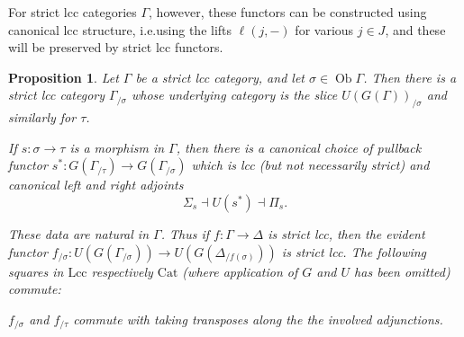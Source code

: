 \documentclass[a4paper]{article}
\newtheorem{proposition}[theorem]{Proposition}
\theoremstyle{remark}
\theoremstyle{definition}
\begin{document}
For strict lcc categories $\Gamma$, however, these functors can be constructed using canonical lcc structure, i.e.\@ using the lifts $\ell(j, -)$ for various $j \in J$, and these will be preserved by strict lcc functors.
\begin{proposition}
  \label{prop:strict-slicing}
  Let $\Gamma$ be a strict lcc category, and let $\sigma \in \operatorname{Ob} \Gamma$.
  Then there is a strict lcc category $\Gamma_{/ \sigma}$ whose underlying category is the slice $U(G(\Gamma))_{/ \sigma}$ and similarly for $\tau$.

  If $s : \sigma \rightarrow \tau$ is a morphism in $\Gamma$, then there is a canonical choice of pullback functor $s^* : G(\Gamma_{/ \tau}) \rightarrow G(\Gamma_{/ \sigma})$ which is lcc (but not necessarily strict) and canonical left and right adjoints
  \begin{equation}
    \Sigma_s \dashv U(s^*) \dashv \Pi_s.
  \end{equation}

  These data are natural in $\Gamma$.
  Thus if $f : \Gamma \rightarrow \Delta$ is strict lcc, then the evident functor $f_{/ \sigma} : U(G(\Gamma_{/ \sigma})) \rightarrow U(G(\Delta_{ / f(\sigma)}))$ is strict lcc.
  The following squares in $\mathrm{Lcc}$ respectively $\mathrm{Cat}$ (where application of $G$ and $U$ has been omitted) commute:
  $f_{/ \sigma}$ and $f_{/ \tau}$ commute with taking transposes along the the involved adjunctions.
\end{proposition}
\end{document}
